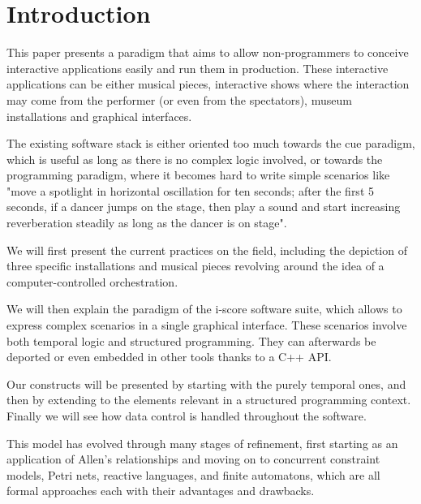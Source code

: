 \documentclass{sigchi}
\begin{document}


\section{Introduction}
This paper presents a paradigm that aims to allow non-programmers 
to conceive interactive applications easily and run them in production. These interactive applications can be either musical pieces, interactive shows where the interaction may come from the performer (or even from the spectators), museum installations and graphical interfaces.

The existing software stack is either oriented too much towards the 
cue paradigm, which is useful as long as there is no complex logic involved, 
or towards the programming paradigm, where it becomes hard to write simple scenarios 
like "move a spotlight in horizontal oscillation for ten seconds; after the first 5 
seconds, if a dancer jumps on the stage, then play a sound and start increasing reverberation steadily as long as the dancer is on stage".

We will first present the current practices on the field, including the depiction of three specific installations and musical pieces revolving around the idea of a computer-controlled orchestration.

We will then explain the paradigm of the i-score software suite, which allows to express complex scenarios in a single graphical interface. These scenarios involve both temporal logic and structured programming. They can afterwards be deported or even embedded in other tools thanks to a C++ API. 

Our constructs will be presented by starting with the purely temporal ones, 
and then by extending to the elements relevant in a structured programming context.
Finally we will see how data control is handled throughout the software.

This model has evolved through many stages of refinement, first starting as an application of 
Allen's relationships\cite{allen1983maintaining} and moving on to concurrent constraint models\cite{allombert2006concurrent,toro2010concurrent}, Petri nets\cite{allombert2007system,arias2014modelling}, reactive languages\cite{arias2014executing}, and finite automatons\cite{arias2015exploiting}, which are all formal approaches each with their advantages and drawbacks. 
\end{document}
